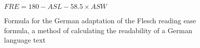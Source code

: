 \begin{figure}[H]
	\caption[Flesch Reading Ease Formula]{Formula for the German adaptation of the Flesch reading ease formula, a method of calculating the readability of a German language text}
	\label{fig:fre}
	\begin{center}
		\begin{math}
		FRE = 180 - ASL - 58.5 \times ASW
		\end{math}
	\end{center}
\end{figure}